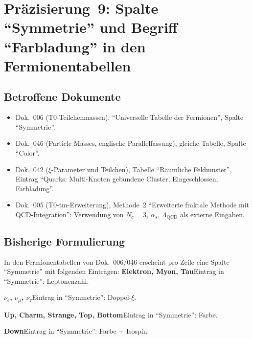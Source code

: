 \section{\texorpdfstring{Präzisierung~9: Spalte \enquote{Symmetrie} und Begriff \enquote{Farbladung} in den Fermionentabellen}{Praezisierung 9: Spalte Symmetrie und Begriff Farbladung in den Fermionentabellen}}

\subsection*{Betroffene Dokumente}

\begin{itemize}
  \item Dok.~006 (T0-Teilchenmassen), \enquote{Universelle Tabelle der
        Fermionen}, Spalte \enquote{Symmetrie}.
  \item Dok.~046 (Particle Masses, englische Parallelfassung), gleiche
        Tabelle, Spalte \enquote{Color}.
  \item Dok.~042 ($\xi$-Parameter und Teilchen), Tabelle
        \enquote{Räumliche Feldmuster}, Eintrag
        \enquote{Quarks: Multi-Knoten gebundene Cluster, Eingeschlossen, Farbladung}.
  \item Dok.~005 (T0-tm-Erweiterung), Methode~2 \enquote{Erweiterte
        fraktale Methode mit QCD-Integration}: Verwendung von
        $N_c = 3$, $\alpha_s$, $\Lambda_{\text{QCD}}$ als
        externe Eingaben.
\end{itemize}

\subsection*{Bisherige Formulierung}

In den Fermionentabellen von Dok.~006/046 erscheint pro Zeile eine
Spalte \enquote{Symmetrie} mit folgenden Einträgen:
\smallskip\noindent \textbf{Elektron, Myon, Tau}\quad Eintrag in \enquote{Symmetrie}: Leptonenzahl.

\smallskip\noindent \textbf{$\nu_e$, $\nu_\mu$, $\nu_\tau$}\quad Eintrag in \enquote{Symmetrie}: Doppel-$\xi$.

\smallskip\noindent \textbf{Up, Charm, Strange, Top, Bottom}\quad Eintrag in \enquote{Symmetrie}: Farbe.

\smallskip\noindent \textbf{Down}\quad Eintrag in \enquote{Symmetrie}: Farbe + Isospin.

